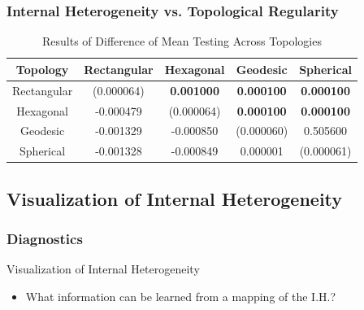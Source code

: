 \documentclass[nototal,handout]{beamer}
\begin{document}
\begin{frame}
	\frametitle{Internal Heterogeneity vs. Topological Regularity}
  \begin{table}
    \begin{minipage}{\textwidth}
    \caption{Results of Difference of Mean Testing Across Topologies}
    \label{rlt:all}
    \begin{tabular}{|c||c|c|c|c|}
    \hline
    \textbf{Topology}&Rectangular&Hexagonal &Geodesic &Spherical\\\hline
    \hline
 	Rectangular & (0.000064) & \textbf{0.001000} & \textbf{0.000100} & \textbf{0.000100}\\\hline
 	Hexagonal & -0.000479 & (0.000064) & \textbf{0.000100} & \textbf{0.000100}\\\hline
 	Geodesic & -0.001329 & -0.000850 & (0.000060) & 0.505600\\\hline
 	Spherical & -0.001328 & -0.000849 & 0.000001 & (0.000061)\\\hline
    \end{tabular}
    \end{minipage}
  \end{table}
 \end{frame} 

\subsection{Visualization of Internal Heterogeneity} 

\begin{frame}
	\frametitle{Diagnostics}
 
\begin{block}{Visualization of Internal Heterogeneity}
 \begin{itemize}
 \item  What information can be learned from a mapping of the I.H.?
 \end{itemize}
 \end{block} \end{frame} 
\end{document}
